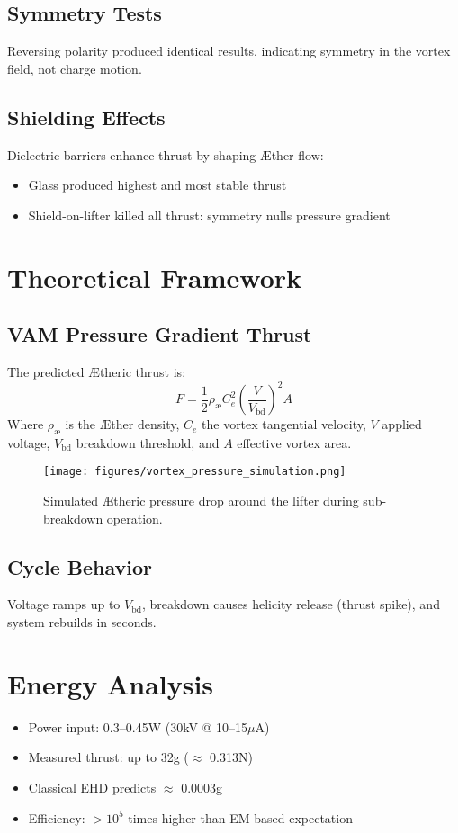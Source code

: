 \subsection{Symmetry Tests}
Reversing polarity produced identical results, indicating symmetry in the vortex field, not charge motion.

\subsection{Shielding Effects}
Dielectric barriers enhance thrust by shaping Æther flow:
\begin{itemize}
    \item Glass produced highest and most stable thrust
    \item Shield-on-lifter killed all thrust: symmetry nulls pressure gradient
\end{itemize}

\section{Theoretical Framework}
\subsection{VAM Pressure Gradient Thrust}
The predicted Ætheric thrust is:
\begin{equation}
    F = \frac{1}{2} \rho_{\text{\ae}} C_e^2 \left( \frac{V}{V_{\text{bd}}} \right)^2 A
\end{equation}
Where $\rho_{\text{\ae}}$ is the Æther density, $C_e$ the vortex tangential velocity, $V$ applied voltage, $V_{\text{bd}}$ breakdown threshold, and $A$ effective vortex area.

\begin{figure}[h!]
    \centering
    \texttt{[image: figures/vortex\_pressure\_simulation.png]}
    \caption{Simulated Ætheric pressure drop around the lifter during sub-breakdown operation.}
\end{figure}

\subsection{Cycle Behavior}
Voltage ramps up to $V_{\text{bd}}$, breakdown causes helicity release (thrust spike), and system rebuilds in seconds.

\section{Energy Analysis}
\begin{itemize}
    \item Power input: 0.3--0.45W (30kV @ 10--15$\mu$A)
    \item Measured thrust: up to 32g ($\approx$ 0.313N)
    \item Classical EHD predicts $\approx$ 0.0003g
    \item Efficiency: $>10^5$ times higher than EM-based expectation
\end{itemize}

